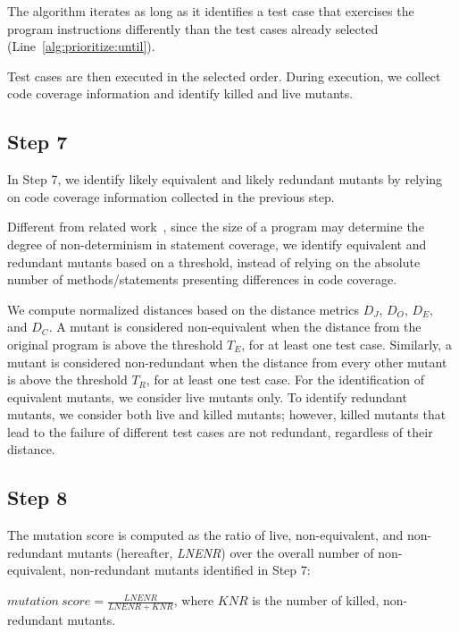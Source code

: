The algorithm iterates as long as it identifies a test case that exercises 
the program instructions differently than the test cases already selected (Line~\ref{alg:prioritize:until}).

Test cases are then executed in the selected order. During  execution, we collect code coverage information and identify killed and live mutants.



\subsection{Step 7}
\label{sec:algostepSeven}


In Step 7, we identify likely equivalent and likely redundant mutants by relying on code coverage information  {collected in the previous step}.

Different from related work~\cite{schuler2013covering}, since the size of a program may determine the degree of non-determinism in statement coverage, 
we identify equivalent and redundant mutants based on a threshold, instead of relying on the absolute number of methods/statements presenting differences in code coverage. 

We compute normalized distances based on the distance metrics $D_J$, $D_O$, $D_E$, and $D_C$. A mutant is considered non-equivalent when the distance from the original program is above the threshold $T_E$, for at least one test case.
Similarly, a mutant is considered non-redundant when the distance from every other mutant is above the threshold $T_R$, for at least one test case. For the identification of equivalent mutants, we consider live mutants only. To identify redundant mutants, we consider both live and killed mutants; however, killed mutants that lead to the failure of different test cases are not redundant, regardless of their distance.

\subsection{Step 8}
\label{sec:appr:score}

The mutation score is computed as the ratio of live, non-equivalent, and non-redundant mutants (hereafter, \emph{LNENR}) over the overall number of non-equivalent, non-redundant mutants identified in Step 7:

$\mathit{mutation}\ \mathit{score} = \frac{\mathit{LNENR}}{\mathit{LNENR}+\mathit{KNR}}$,
where $\mathit{KNR}$ is the number of killed, non-redundant mutants.

%
%
%
